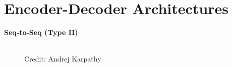 \documentclass[11pt,compress,t,notes=noshow]{beamer}
\begin{document}
\section{Encoder-Decoder Architectures}


\begin{frame}


\vspace{15mm}
\hspace{25mm} \textbf{\LARGE{Seq-to-Seq (Type II)}}
\begin{figure}
      \centering
      \tiny{\\Credit: Andrej Karpathy}
  \end{figure}
  
\end{frame}
\end{document}
